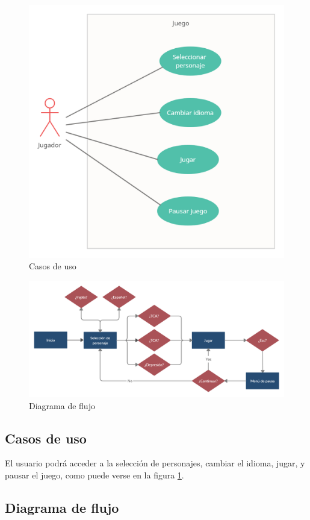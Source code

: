 \documentclass[12pt, a4paper,twoside,titlepage]{book}
\begin{document}
\begin{figure}
	\centering
	\includegraphics[width=.6\linewidth]{TGF/Extra/Casos de uso.png}
	\caption{Casos de uso}
	\label{fig:casosuso}
\end{figure}

\begin{landscape}
\begin{figure}
	\centering
	\includegraphics[width=.8\linewidth]{TGF/Extra/Flow.png}
	\caption{Diagrama de flujo}
	\label{fig:diagramaflujo}
\end{figure}
\end{landscape}


\subsection{Casos de uso}


El usuario podrá acceder a la selección de personajes, cambiar el idioma, jugar, y pausar el juego, como puede verse en la figura \ref{fig:casosuso}. 



\subsection{Diagrama de flujo}
\end{document}
